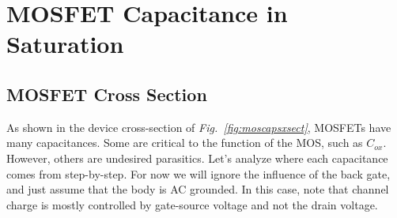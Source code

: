 \section{MOSFET Capacitance in Saturation}
\subsection{MOSFET Cross Section}
As shown in the device cross-section of \emph{Fig.~\ref{fig:moscapsxsect}}, MOSFETs have many capacitances. Some are critical to the function of the MOS, such as $C_{ox}$.  However, others are undesired parasitics.  Let's analyze where each capacitance comes from step-by-step.  For now we will ignore the influence of the back gate, and just assume that the body is AC grounded. In this case, note that channel charge is mostly controlled by gate-source voltage and not the drain voltage.  
